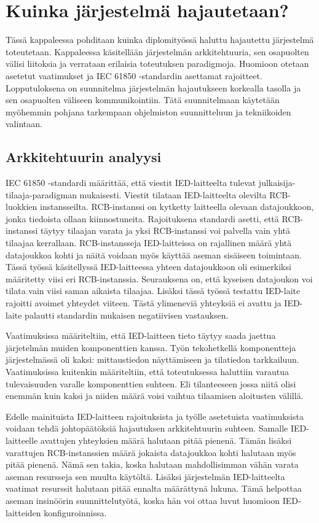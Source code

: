 \chapter{Kuinka järjestelmä hajautetaan?}
Tässä kappaleessa pohditaan kuinka diplomityössä haluttu hajautettu järjestelmä toteutetaan. Kappaleessa käsitellään järjestelmän arkkitehtuuria, sen osapuolten välisi liitoksia ja verrataan erilaisia toteutuksen paradigmoja. Huomioon otetaan asetetut vaatimukset ja IEC 61850 -standardin asettamat rajoitteet. Lopputuloksena on suunnitelma järjestelmän hajautukseen korkealla tasolla ja sen osapuolten väliseen kommunikointiin. Tätä suunnitelmaan käytetään myöhemmin pohjana tarkempaan ohjelmiston suunnitteluun ja tekniikoiden valintaan.


\section{Arkkitehtuurin analyysi}
\label{ch:architecture-analysis}
IEC 61850 -standardi määrittää, että viestit IED-laitteelta tulevat julkaisija-tilaaja-pa\-ra\-dig\-man mukaisesti. Viestit tilataan IED-laitteelta olevilta RCB-luokkien instansseilta. RCB-instanssi on kytketty laitteella olevaan datajoukkoon, jonka tiedoista ollaan kiinnostuneita. Rajoituksena standardi asetti, että RCB-instanssi täytyy tilaajan varata ja yksi RCB-instanssi voi palvella vain yhtä tilaajaa kerrallaan. RCB-instansseja IED-laitteissa on rajallinen määrä yhtä datajoukkoa kohti ja näitä voidaan myös käyttää aseman sisäiseen toimintaan. Tässä työssä käsitellyssä IED-laitteessa yhteen datajoukkoon oli esimerkiksi määritetty viisi eri RCB-instanssia. Seurauksena on, että kyseisen datajoukon voi tilata vain viisi saman aikaista tilaajaa. Lisäksi tässä työssä testattu IED-laite rajoitti avoimet yhteydet viiteen. Tästä ylimeneviä yhteyksiä ei avattu ja IED-laite palautti standardin mukaisen negatiivisen vastauksen.

Vaatimuksissa määriteltiin, että IED-laitteen tieto täytyy saada jaettua järjetelmän muiden komponenttien kanssa. Työn tekohetkellä komponentteja järjestelmässä oli kaksi: mittaustiedon näyttämiseen ja tilatiedon tarkkailuun. Vaatimuksissa kuitenkin määriteltiin, että toteutuksessa haluttiin varautua tulevaisuuden varalle komponenttien suhteen. Eli tilanteeseen jossa niitä olisi enemmän kuin kaksi ja niiden määrä voisi vaihtua tilaamisen aloitusten välillä. 

Edelle mainituista IED-laitteen rajoituksista ja työlle asetetuista vaatimuksista voidaan tehdä johtopäätöksiä hajautuksen arkkitehtuurin suhteen. Samalle IED-laitteelle avattujen yhteyksien määrä halutaan pitää pienenä. Tämän lisäksi varattujen RCB-instanssien määrä jokaista datajoukkoa kohti halutaan myös pitää pienenä. Nämä sen takia, koska halutaan mahdollisimman vähän varata aseman resursseja sen muulta käytöltä. Lisäksi järjestelmän IED-laitteelta vaatimat resurssit halutaan pitää ennalta määrättynä lukuna. Tämä helpottaa aseman insinöörin suunnittelutyötä, koska hän voi ottaa luvut huomioon IED-laitteiden konfiguroinnissa.

